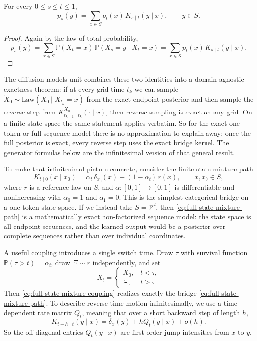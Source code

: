 \documentclass[11pt]{article}
\begin{document}
\begin{proposition}
\label{prop:reverse-kernels-transport}
For every \(0\le s\le t\le 1\),
\[
  p_s(y)
  =
  \sum_{x\in S} p_t(x)\,K_{s\mid t}(y\mid x),
  \qquad y\in S.
\]
\end{proposition}
\begin{proof}
Again by the law of total probability,
\[
  p_s(y)
  =
  \sum_{x\in S}
  \mathbb{P}(X_t=x)\,\mathbb{P}(X_s=y\mid X_t=x)
  =
  \sum_{x\in S} p_t(x)\,K_{s\mid t}(y\mid x).
\]
\end{proof}

The diffusion-models unit combines these two identities into a domain-agnostic exactness theorem:
if at every grid time \(t_k\) we can sample \(\tilde X_0\sim\mathrm{Law}(X_0\mid X_{t_k}=x)\) from the exact endpoint posterior and then sample the reverse step from \(K^{\tilde X_0}_{t_{k-1}\mid t_k}(\cdot\mid x)\), then reverse sampling is exact on any grid.
On a finite state space the same statement applies verbatim.
So for the exact one-token or full-sequence model there is no approximation to explain away: once the full posterior is exact, every reverse step uses the exact bridge kernel.
The generator formulas below are the infinitesimal version of that general result.

To make that infinitesimal picture concrete, consider the finite-state mixture path
\begin{equation}
  K_{t\mid 0}(x\mid x_0)
  =
  \alpha_t\,\delta_{x_0}(x)+(1-\alpha_t)\,r(x),
  \qquad x,x_0\in S,
  \label{eq:full-state-mixture-path}
\end{equation}
where \(r\) is a reference law on \(S\), and \(\alpha:[0,1]\to[0,1]\) is differentiable and nonincreasing with \(\alpha_0=1\) and \(\alpha_1=0\).
This is the simplest categorical bridge on a one-token state space.
If we instead take \(S=\mathcal{V}^d\), then \eqref{eq:full-state-mixture-path} is a mathematically exact non-factorized sequence model: the state space is all endpoint sequences, and the learned output would be a posterior over complete sequences rather than over individual coordinates.

A useful coupling introduces a single switch time.
Draw \(\tau\) with survival function \(\mathbb{P}(\tau>t)=\alpha_t\), draw \(\Xi\sim r\) independently, and set
\begin{equation}
  X_t=
  \begin{cases}
    X_0, & t<\tau,\\
    \Xi, & t\ge \tau.
  \end{cases}
  \label{eq:full-state-mixture-coupling}
\end{equation}
Then \eqref{eq:full-state-mixture-coupling} realizes exactly the bridge \eqref{eq:full-state-mixture-path}.
To describe reverse-time motion infinitesimally, we use a time-dependent rate matrix \(Q_t\), meaning that over a short backward step of length \(h\),
\[
  K_{t-h\mid t}(y\mid x)
  =
  \delta_x(y)+hQ_t(y\mid x)+o(h).
\]
So the off-diagonal entries \(Q_t(y\mid x)\) are first-order jump intensities from \(x\) to \(y\).
\end{document}
